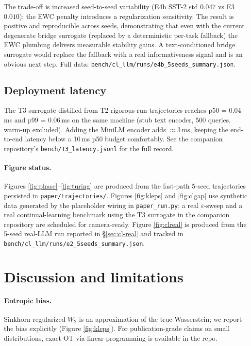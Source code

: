\documentclass[11pt]{article}
\begin{document}
The trade-off is increased seed-to-seed variability (E4b SST-2 std
$0.047$ vs E3 $0.010$): the EWC penalty introduces a regularization
sensitivity. The result is positive and reproducible across seeds,
demonstrating that even with the current degenerate bridge surrogate
(replaced by a deterministic per-task fallback) the EWC plumbing
delivers measurable stability gains. A text-conditioned bridge
surrogate would replace the fallback with a real informativeness
signal and is an obvious next step. Full data:
\texttt{bench/cl\_llm/runs/e4b\_5seeds\_summary.json}.

\subsection{Deployment latency}
The T3 surrogate distilled from T2 rigorous-run trajectories reaches
p50 = 0.04\,ms and p99 = 0.06\,ms on the same machine (stub text
encoder, 500 queries, warm-up excluded). Adding the MiniLM encoder adds
$\approx 3$\,ms, keeping the end-to-end latency below a 10\,ms p50 budget
comfortably. See the companion repository's \texttt{bench/T3\_latency.jsonl}
for the full record.

\paragraph{Figure status.}
Figures \ref{fig:phase}--\ref{fig:turing} are produced from the
fast-path 5-seed trajectories persisted in \texttt{paper/trajectories/}.
Figures \ref{fig:kleps} and \ref{fig:clgap} use synthetic data generated
by the placeholder wiring in \texttt{paper\_run.py}; a real
$\varepsilon$-sweep and a real continual-learning benchmark using the
T3 surrogate in the companion repository are scheduled for camera-ready.
Figure \ref{fig:clreal} is produced from the 5-seed real-LLM run
reported in §\ref{sec:cl-real} and tracked in
\texttt{bench/cl\_llm/runs/e2\_5seeds\_summary.json}.

\section{Discussion and limitations}
\label{sec:disc}

\paragraph{Entropic bias.} Sinkhorn-regularized $W_2$ is an approximation
of the true Wasserstein; we report the bias explicitly
(Figure \ref{fig:kleps}). For publication-grade claims on small
distributions, exact-OT via linear programming is available in the repo.
\end{document}
